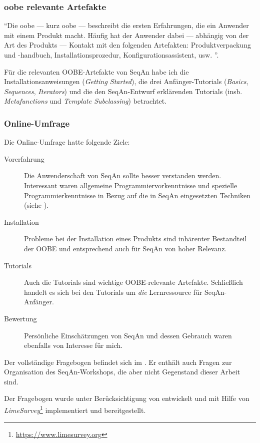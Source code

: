 \subsubsection{\acrlong{oobe} relevante Artefakte}
\label{sec:oobe}

``Die \acrlong{oobe} --- kurz \acrshort{oobe} --- beschreibt die ersten Erfahrungen, die ein Anwender mit einem Produkt macht. Häufig hat der Anwender dabei --- abhängig von der Art des Produkts --- Kontakt mit den folgenden Artefakten: Produktverpackung und -handbuch, Installationsprozedur, Konfigurationsassistent, usw. \citep{Fouts:2000:SLE:353360.353375}''. \citep{Kahlert:2011wr}

Für die relevanten OOBE-Artefakte von SeqAn habe ich die Installationsanweisungen (\textit{Getting Started}), die drei Anfänger-Tutorials (\textit{Basics}, \textit{Sequences}, \textit{Iterators}) und die den SeqAn-Entwurf erklärenden Tutorials (insb. \textit{Metafunctions} und \textit{Template Subclassing}) betrachtet.

\subsubsection{Online-Umfrage}

Die Online-Umfrage hatte folgende Ziele:
\begin{description}
  \item[Vorerfahrung] Die Anwenderschaft von SeqAn sollte besser verstanden werden. Interessant waren allgemeine Programmiervorkenntnisse und spezielle Programmierkenntnisse in Bezug auf die in SeqAn eingesetzten Techniken (siehe ).
  \item[Installation] Probleme bei der Installation eines Produkts sind inhärenter Bestandteil der OOBE und entsprechend auch für SeqAn von hoher Relevanz.
  \item[Tutorials] Auch die Tutorials sind wichtige OOBE-relevante Artefakte. Schließlich handelt es sich bei den Tutorials um \textit{die} Lernressource für SeqAn-Anfänger.
  \item[Bewertung] Persönliche Einschätzungen von SeqAn und dessen Gebrauch waren ebenfalls von Interesse für mich.  
\end{description}

Der vollständige Fragebogen befindet sich im . Er enthält auch Fragen zur Organisation des SeqAn-Workshops, die aber nicht Gegenstand dieser Arbeit sind.

Der Fragebogen wurde unter Berücksichtigung von \cite{mayring2002einfhrung} entwickelt und mit Hilfe von \textit{LimeSurvey}\footnote{\url{https://www.limesurvey.org}} implementiert und bereitgestellt.

